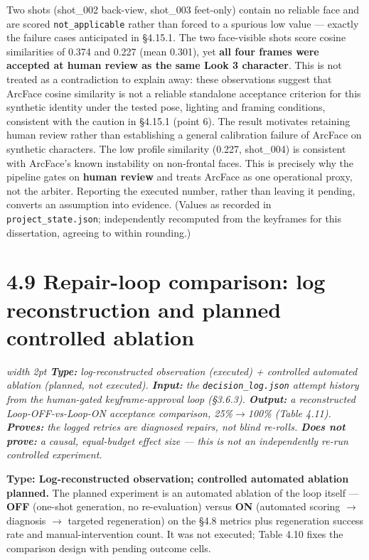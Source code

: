 \documentclass[10pt,twocolumn,letterpaper]{article}
\newenvironment{quotebox}%
 {\par\vspace{3pt}\noindent\begin{list}{}{\setlength{\leftmargin}{1em}\setlength{\rightmargin}{0.5em}}\item\footnotesize\itshape\color{black!80}\hspace*{-0.6em}\vrule width 2pt\hspace{0.6em}\ignorespaces}%
 {\end{list}\vspace{3pt}}
\begin{document}
Two shots (shot\_002 back-view, shot\_003 feet-only) contain no reliable face and are scored \texttt{not\_applicable} rather than forced to a spurious low value --- exactly the failure cases anticipated in \S{}4.15.1. The two face-visible shots score cosine similarities of 0.374 and 0.227 (mean 0.301), yet \textbf{all four frames were accepted at human review as the same Look 3 character}. This is not treated as a contradiction to explain away: these observations suggest that ArcFace cosine similarity is not a reliable standalone acceptance criterion for this synthetic identity under the tested pose, lighting and framing conditions, consistent with the caution in \S{}4.15.1 (point 6). The result motivates retaining human review rather than establishing a general calibration failure of ArcFace on synthetic characters. The low profile similarity (0.227, shot\_004) is consistent with ArcFace's known instability on non-frontal faces. This is precisely why the pipeline gates on \textbf{human review} and treats ArcFace as one operational proxy, not the arbiter. Reporting the executed number, rather than leaving it pending, converts an assumption into evidence. (Values as recorded in \texttt{project\_state.json}; independently recomputed from the keyframes for this dissertation, agreeing to within rounding.)


\section*{4.9 Repair-loop comparison: log reconstruction and planned controlled ablation}

\begin{quotebox}
\textbf{Type:} log-reconstructed observation (executed) + controlled automated ablation (planned, not executed). \quad \textbf{Input:} the \texttt{decision\_log.json} attempt history from the human-gated keyframe-approval loop (\S{}3.6.3). \quad \textbf{Output:} a reconstructed Loop-OFF-vs-Loop-ON acceptance comparison, 25\%$\rightarrow$100\% (Table 4.11). \quad \textbf{Proves:} the logged retries are diagnosed repairs, not blind re-rolls. \quad \textbf{Does not prove:} a causal, equal-budget effect size --- this is not an independently re-run controlled experiment.
\end{quotebox}

\textbf{Type: Log-reconstructed observation; controlled automated ablation planned.} The planned experiment is an automated ablation of the loop itself --- \textbf{OFF} (one-shot generation, no re-evaluation) versus \textbf{ON} (automated scoring $\rightarrow$ diagnosis $\rightarrow$ targeted regeneration) on the \S{}4.8 metrics plus regeneration success rate and manual-intervention count. It was not executed; Table 4.10 fixes the comparison design with pending outcome cells.
\end{document}
